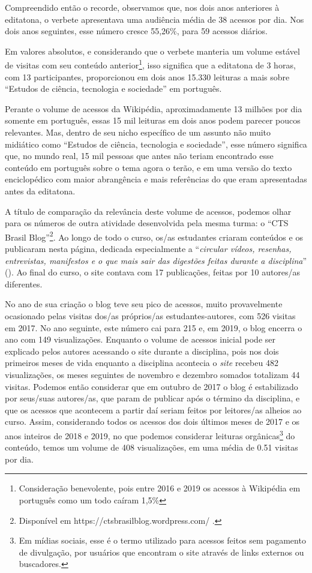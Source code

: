 Compreendido então o recorde, observamos que, nos dois anos anteriores à editatona, o verbete apresentava uma audiência média de 38 acessos por dia. Nos dois anos seguintes, esse número cresce 55,26\%, para 59 acessos diários.

Em valores absolutos, e considerando que o verbete manteria um volume estável de visitas com seu conteúdo anterior\footnote{Consideração benevolente, pois entre 2016 e 2019 os acessos à Wikipédia em português como um todo caíram 1,5\%\citep{wikimedia_stats_page_views_ptwiki}}, isso significa que a editatona de 3 horas, com 13 participantes, proporcionou em dois anos 15.330 leituras a mais sobre ``Estudos de ciência, tecnologia e sociedade'' em português.

Perante o volume de acessos da Wikipédia, aproximadamente 13 milhões por dia somente em português\citep{wikimedia_stats_page_views_ptwiki}, essas 15 mil leituras em dois anos podem parecer poucos relevantes. Mas, dentro de seu nicho específico de um assunto não muito midiático como ``Estudos de ciência, tecnologia e sociedade'', esse número significa que, no mundo real, 15 mil pessoas que antes não teriam encontrado esse conteúdo em português sobre o tema agora o terão, e em uma versão do texto enciclopédico com maior abrangência e mais referências do que eram apresentadas antes da editatona.

A título de comparação da relevância deste volume de acessos, podemos olhar para os números de outra atividade desenvolvida pela mesma turma: o ``CTS Brasil Blog''\footnote{Disponível em https://ctsbrasilblog.wordpress.com/ .}. Ao longo de todo o curso, os/as estudantes criaram conteúdos e os publicaram nesta página, dedicada especialmente a ``\textit{circular vídeos, resenhas, entrevistas, manifestos e o que mais sair das digestões feitas durante a disciplina}'' (\cite{cts_brasil_blog}). Ao final do curso, o site contava com 17 publicações, feitas por 10 autores/as diferentes.

No ano de sua criação o blog teve seu pico de acessos, muito provavelmente ocasionado pelas visitas dos/as próprios/as estudantes-autores, com 526 visitas em 2017. No ano seguinte, este número cai para 215 e, em 2019, o blog encerra o ano com 149 visualizações. Enquanto o volume de acessos inicial pode ser explicado pelos autores acessando o site durante a disciplina, pois nos dois primeiros meses de vida enquanto a disciplina acontecia o \textit{site} recebeu 482 visualizações, os meses seguintes de novembro e dezembro somados totalizam 44 visitas. Podemos então considerar que em outubro de 2017 o blog é estabilizado por seus/suas autores/as, que param de publicar após o término da disciplina, e que os acessos que acontecem a partir daí seriam feitos por leitores/as alheios ao curso. Assim, considerando todos os acessos dos dois últimos meses de 2017 e os anos inteiros de 2018 e 2019, no que podemos considerar leituras orgânicas\footnote{Em mídias sociais, esse é o termo utilizado para acessos feitos sem pagamento de divulgação, por usuários que encontram o site através de links externos ou buscadores.} do conteúdo, temos um volume de 408 visualizações, em uma média de 0.51 visitas por dia.

